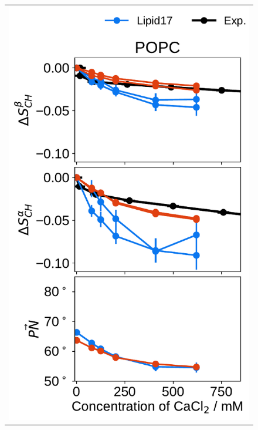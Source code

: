 \documentclass[journal=jpcbfk,manuscript=article]{achemso}
\newlength{\figheightsmall}
\newlength{\figheight}
\begin{document}
\begin{figure}[tbp!]
\begin{tabular}{ c }
  \includegraphics[height=1.5\figheightsmall]{../img/ecc_pops/order_parameters_changes_ecc-lip_L14_A-B-PN-COO_POPC_cacl.pdf} 

\end{tabular}
\end{figure}
\end{document}
